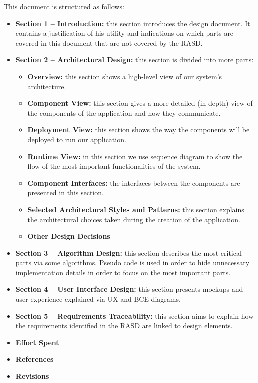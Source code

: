 \documentclass[english]{article}
\begin{document}
This document is structured as follows:
\begin{itemize}
\item{\textbf{Section 1 -- Introduction:} this section introduces the design document. It contains
	a justification of his utility and indications on which parts are covered in
	this document that are not covered by the RASD.}
\item{\textbf{Section 2 -- Architectural Design:} this section is divided into more parts:
	\begin{itemize}
		\item{\textbf{Overview:} this section shows a high-level view of our system's architecture.}
		\item{\textbf{Component View:} this section gives a more detailed (in-depth) view of the components of the application and how they communicate.}
		\item{\textbf{Deployment View:} this section shows the way the components will be deployed to run our application.}
		\item{\textbf{Runtime View:} in this section we use sequence diagram to show the flow of the most important functionalities of the system.}
		\item{\textbf{Component Interfaces:} the interfaces between the components are presented in this section.}
		\item{\textbf{Selected Architectural Styles and Patterns:} this section explains the architectural choices taken during the creation of the application.}
		\item{\textbf{Other Design Decisions}}
	\end{itemize}}
\item{\textbf{Section 3 -- Algorithm Design:} this section describes the most critical parts via some algorithms. Pseudo code is used in order to hide unnecessary implementation details in order to focus on the most important parts.}
\item{\textbf{Section 4 -- User Interface Design:} this section presents mockups and user experience explained via UX and BCE diagrams.}
\item{\textbf{Section 5 -- Requirements Traceability:} this section aims to explain how the requirements identified in the RASD are linked to design elements.}
\item{\textbf{Effort Spent} }
\item{\textbf{References} }
\item{\textbf{Revisions} }
\end{itemize}
\end{document}
